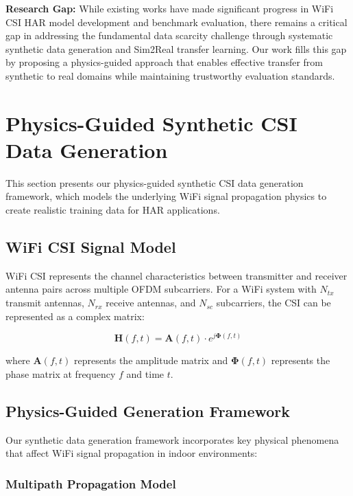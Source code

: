 \documentclass[journal]{IEEEtran}
\begin{document}
\textbf{Research Gap:} While existing works have made significant progress in WiFi CSI HAR model development and benchmark evaluation, there remains a critical gap in addressing the fundamental data scarcity challenge through systematic synthetic data generation and Sim2Real transfer learning. Our work fills this gap by proposing a physics-guided approach that enables effective transfer from synthetic to real domains while maintaining trustworthy evaluation standards.

\section{Physics-Guided Synthetic CSI Data Generation}

This section presents our physics-guided synthetic CSI data generation framework, which models the underlying WiFi signal propagation physics to create realistic training data for HAR applications.

\subsection{WiFi CSI Signal Model}

WiFi CSI represents the channel characteristics between transmitter and receiver antenna pairs across multiple OFDM subcarriers. For a WiFi system with $N_{tx}$ transmit antennas, $N_{rx}$ receive antennas, and $N_{sc}$ subcarriers, the CSI can be represented as a complex matrix:

\begin{equation}
\mathbf{H}(f,t) = \mathbf{A}(f,t) \cdot e^{j\boldsymbol{\Phi}(f,t)}
\end{equation}

where $\mathbf{A}(f,t)$ represents the amplitude matrix and $\boldsymbol{\Phi}(f,t)$ represents the phase matrix at frequency $f$ and time $t$.

\subsection{Physics-Guided Generation Framework}

Our synthetic data generation framework incorporates key physical phenomena that affect WiFi signal propagation in indoor environments:

\subsubsection{Multipath Propagation Model}
\end{document}
